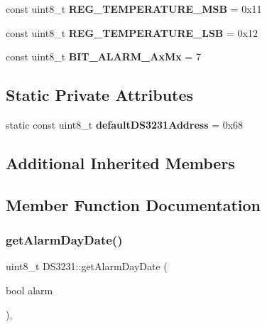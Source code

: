 \begin{DoxyCompactItemize}
\item 
\mbox{\label{class_d_s3231_a0334c3d383e5f28df368f21062672228}} 
const uint8\+\_\+t {\bfseries R\+E\+G\+\_\+\+T\+E\+M\+P\+E\+R\+A\+T\+U\+R\+E\+\_\+\+M\+SB} = 0x11
\item 
\mbox{\label{class_d_s3231_a6bc742bfa52c83f252787045c9952a45}} 
const uint8\+\_\+t {\bfseries R\+E\+G\+\_\+\+T\+E\+M\+P\+E\+R\+A\+T\+U\+R\+E\+\_\+\+L\+SB} = 0x12
\item 
\mbox{\label{class_d_s3231_a5f55646a365acc7123c76b2c363eb416}} 
const uint8\+\_\+t {\bfseries B\+I\+T\+\_\+\+A\+L\+A\+R\+M\+\_\+\+Ax\+Mx} = 7
\end{DoxyCompactItemize}
\subsection*{Static Private Attributes}
\begin{DoxyCompactItemize}
\item 
\mbox{\label{class_d_s3231_a9c6b5e3dea008155e78dfc6623fe41b9}} 
static const uint8\+\_\+t {\bfseries default\+D\+S3231\+Address} = 0x68
\end{DoxyCompactItemize}
\subsection*{Additional Inherited Members}


\subsection{Member Function Documentation}
\mbox{\label{class_d_s3231_a0b013c68f96b5145c1c9feb9270855a7}} 
\subsubsection{\texorpdfstring{get\+Alarm\+Day\+Date()}{getAlarmDayDate()}}
{\footnotesize\ttfamily uint8\+\_\+t D\+S3231\+::get\+Alarm\+Day\+Date (\begin{DoxyParamCaption}\item[{bool}]{alarm }\end{DoxyParamCaption})\hspace{0.3cm}{\ttfamily [override]}, {\ttfamily [virtual]}}



